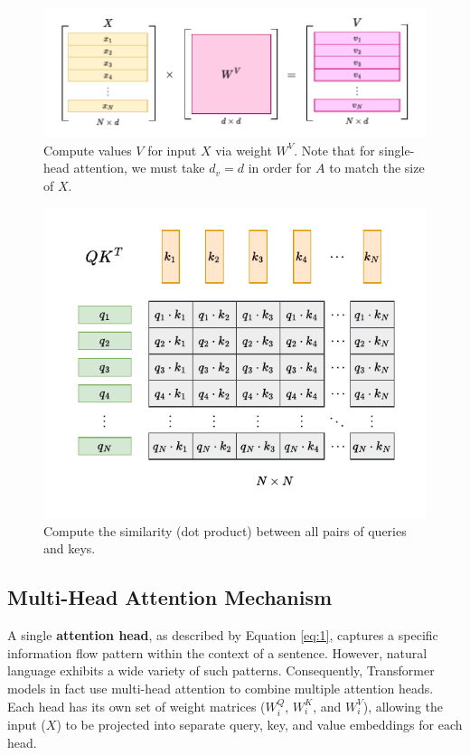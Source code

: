 \begin{figure}
    \centering
    \includegraphics[width=1\linewidth]{fig/XWV.pdf}
    \caption{Compute values $V$ for input $X$ via weight $W^V$. Note that for single-head attention, we must take $d_v = d$ in order for $A$ to match the size of $X$.}
    \label{fig:XWV}
\end{figure}

\begin{figure}
    \centering
    \includegraphics[width=0.8\linewidth]{fig/QK-T.pdf}
    \caption{Compute the similarity (dot product) between all pairs of queries and keys.}
    \label{fig:QK^T}
\end{figure}

\subsection{Multi-Head Attention Mechanism}

A single \textbf{attention head}, as described by Equation \eqref{eq:1}, captures a specific information flow pattern within the context of a sentence. However, natural language exhibits a wide variety of such patterns. Consequently, Transformer models in fact use multi-head attention to combine multiple attention heads. Each head has its own set of weight matrices ($W^Q_i$, $W^K_i$, and $W^V_i$), allowing the input ($X$) to be projected into separate query, key, and value embeddings for each head.

